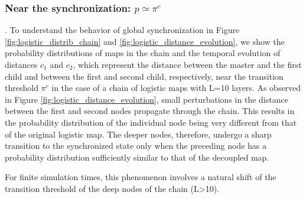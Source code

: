 \documentclass[runningheads]{llncs}
\begin{document}
\subsubsection{Near the synchronization: $p \simeq \pi^c$}. 
To understand the behavior of global synchronization in Figure \ref{fig:logistic_distrib_chain} and \ref{fig:logistic_distance_evolution}, we show the probability distributions of maps in the chain and the temporal evolution of distances $c_1$ and $c_2$, which represent the distance between the master and the first child and between the first and second child, respectively, near the transition threshold $\pi^c$ in the case of a chain of logistic maps with L=10 layers. As observed in Figure \ref{fig:logistic_distance_evolution}, small perturbations in the distance between the first and second nodes propagate through the chain. This results in the probability distribution of the individual node being very different from that of the original logistic map. The deeper nodes, therefore, undergo a sharp transition to the synchronized state only when the preceding node has a probability distribution sufficiently similar to that of the decoupled map.

For finite simulation times, this phenomenon involves a natural shift of the transition threshold of the deep nodes of the chain (L>10). \\
\end{document}

